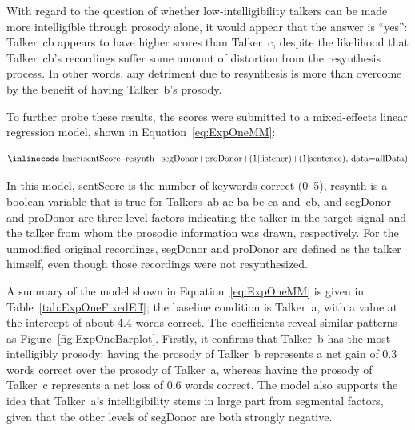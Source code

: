 With regard to the question of whether low-intelligibility talkers can be made more intelligible through prosody alone, it would appear that the answer is “yes”: Talker~\ac{cb} appears to have higher scores than Talker~\ac{c}, despite the likelihood that Talker~\ac{cb}’s recordings suffer some amount of distortion from the resynthesis process.  In other words, any detriment due to resynthesis is more than overcome by the benefit of having Talker~\ac{b}’s prosody.  

To further probe these results, the scores were submitted to a mixed-effects linear regression model, shown in Equation~\ref{eq:ExpOneMM}:

\begin{equation}\label{eq:ExpOneMM}
	\text{{\inlinecode lmer(sentScore\textasciitilde resynth+segDonor+proDonor+(1|listener)+(1|sentence), data=allData)}}
\end{equation}

In this model, {\inlinecode sentScore} is the number of keywords correct (0–5), {\inlinecode resynth} is a boolean variable that is true for Talkers~\ac{ab ac ba bc ca} and~\ac{cb}, and {\inlinecode segDonor} and {\inlinecode proDonor} are three-level factors indicating the talker in the target signal and the talker from whom the prosodic information was drawn, respectively.  For the unmodified original recordings, {\inlinecode segDonor} and {\inlinecode proDonor} are defined as the talker himself, even though those recordings were not resynthesized.  

A summary of the model shown in Equation~\ref{eq:ExpOneMM} is given in Table~\ref{tab:ExpOneFixedEff}; the baseline condition is Talker~\ac{a}, with a value at the intercept of about 4.4 words correct.  The coefficients reveal similar patterns as Figure~\ref{fig:ExpOneBarplot}.  Firstly, it confirms that Talker~\ac{b} has the most intelligibly prosody: having the prosody of Talker~\ac{b} represents a net gain of 0.3 words correct over the prosody of Talker~\ac{a}, whereas having the prosody of Talker~\ac{c} represents a net loss of 0.6 words correct.  The model also supports the idea that Talker~\ac{a}’s intelligibility stems in large part from segmental factors, given that the other levels of {\inlinecode segDonor} are both strongly negative.


